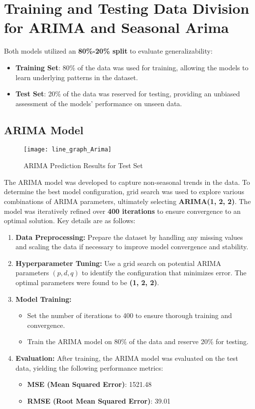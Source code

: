 \section*{Training and Testing Data Division for ARIMA and Seasonal Arima}
Both models utilized an \textbf{80\%-20\% split} to evaluate generalizability:
\begin{itemize}
	\item \textbf{Training Set}: 80\% of the data was used for training, allowing the models to learn underlying patterns in the dataset.
	\item \textbf{Test Set}: 20\% of the data was reserved for testing, providing an unbiased assessment of the models' performance on unseen data.
\end{itemize}
\subsection{ARIMA Model}

\begin{figure}[H]
	\centering
	\texttt{[image: line\_graph\_Arima]}
	\caption{ARIMA Prediction Results for Test Set}
	\label{fig:Arima_result}
\end{figure}

The ARIMA model was developed to capture non-seasonal trends in the data. To determine the best model configuration, grid search was used to explore various combinations of ARIMA parameters, ultimately selecting \textbf{ARIMA(1, 2, 2)}. The model was iteratively refined over \textbf{400 iterations} to ensure convergence to an optimal solution. Key details are as follows:

\begin{enumerate}
	\item \textbf{Data Preprocessing:}  
	Prepare the dataset by handling any missing values and scaling the data if necessary to improve model convergence and stability.
	
	\item \textbf{Hyperparameter Tuning:}  
	Use a grid search on potential ARIMA parameters $(p, d, q)$ to identify the configuration that minimizes error. The optimal parameters were found to be \textbf{(1, 2, 2)}.
	
	\item \textbf{Model Training:}
	\begin{itemize}
		\item Set the number of iterations to 400 to ensure thorough training and convergence.
		\item Train the ARIMA model on 80\% of the data and reserve 20\% for testing.
	\end{itemize}
	
	\item \textbf{Evaluation:}  
	After training, the ARIMA model was evaluated on the test data, yielding the following performance metrics:
	\begin{itemize}
		\item \textbf{MSE (Mean Squared Error)}: 1521.48
		\item \textbf{RMSE (Root Mean Squared Error)}: 39.01
	\end{itemize}
\end{enumerate}


